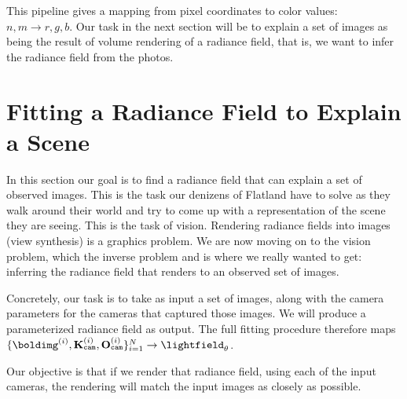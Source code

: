 This pipeline gives a mapping from pixel coordinates to color values: $n,m \rightarrow r,g,b$. Our task in the next section will be to explain a set of images as being the result of volume rendering of a radiance field, that is, we want to infer the radiance field from the photos.


\section{Fitting a Radiance Field to Explain a Scene}\label{sec:nerfs:fitting}

In this section our goal is to find a radiance field that can explain a set of observed images. This is the task our denizens of Flatland have to solve as they walk around their world and try to come up with a representation of the scene they are seeing. This is the task of vision. Rendering radiance fields into images (view synthesis) is a graphics problem. We are now moving on to the vision problem, which the inverse problem and is where we really wanted to get: inferring the radiance field that renders to an observed set of images.

Concretely, our task is to take as input a set of images, along with the camera parameters for the cameras that captured those images. We will produce a parameterized radiance field as output. The full fitting procedure therefore maps $\{\boldimg^{(i)}, \mathbf{K}^{(i)}_{\texttt{cam}}, \mathbf{O}^{(i)}_{\texttt{cam}}\}_{i=1}^N \rightarrow \lightfield_{\theta}$.

Our objective is that if we render that radiance field, using each of the input cameras, the rendering will match the input images as closely as possible.



